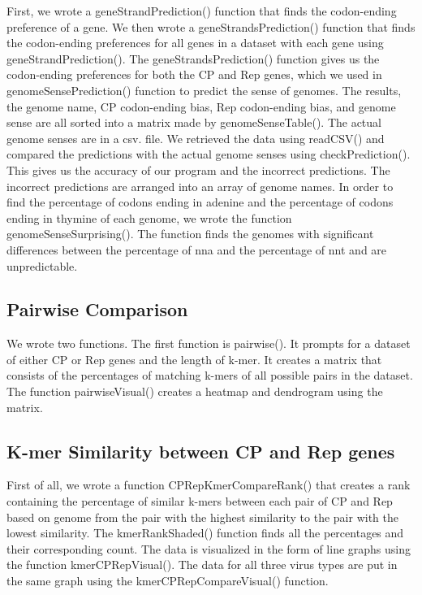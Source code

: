 \documentclass[eng]{ajceam-class}
\begin{document}
First, we wrote a geneStrandPrediction() function that finds the codon-ending preference of a gene. We then wrote a geneStrandsPrediction() function that finds the codon-ending preferences for all genes in a dataset with each gene using geneStrandPrediction(). The geneStrandsPrediction() function gives us the codon-ending preferences for both the CP and Rep genes, which we used in genomeSensePrediction() function to predict the sense of genomes. The results, the genome name, CP codon-ending bias, Rep codon-ending bias, and genome sense are all sorted into a matrix made by genomeSenseTable(). The actual genome senses are in a csv. file. We retrieved the data using readCSV() and compared the predictions with the actual genome senses using checkPrediction(). This gives us the accuracy of our program and the incorrect predictions. The incorrect predictions are arranged into an array of genome names. In order to find the percentage of codons ending in adenine and the percentage of codons ending in thymine of each genome, we wrote the function genomeSenseSurprising(). The function finds the genomes with significant differences between the percentage of nna and the percentage of nnt and are unpredictable.

\subsection{Pairwise Comparison}

We wrote two functions. The first function is pairwise(). It prompts for a dataset of either CP or Rep genes and the length of k-mer. It creates a matrix that consists of the percentages of matching k-mers of all possible pairs in the dataset. The function pairwiseVisual() creates a heatmap and dendrogram using the matrix.

\subsection{K-mer Similarity between CP and Rep genes}

First of all, we wrote a function CPRepKmerCompareRank() that creates a rank containing the percentage of similar k-mers between each pair of CP and Rep based on genome from the pair with the highest similarity to the pair with the lowest similarity. The kmerRankShaded() function finds all the percentages and their corresponding count. The data is visualized in the form of line graphs using the function kmerCPRepVisual(). The data for all three virus types are put in the same graph using the kmerCPRepCompareVisual() function.
\end{document}
